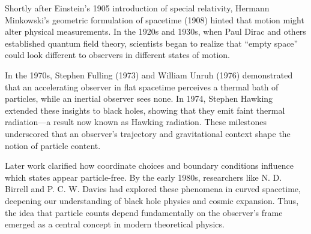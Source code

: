 \begin{historical}
Shortly after Einstein’s 1905 introduction of special relativity, Hermann Minkowski’s geometric formulation of spacetime (1908) hinted that motion might alter physical measurements. In the 1920s and 1930s, when Paul Dirac and others established quantum field theory, scientists began to realize that “empty space” could look different to observers in different states of motion.

In the 1970s, Stephen Fulling (1973) and William Unruh (1976) demonstrated that an accelerating observer in flat spacetime perceives a thermal bath of particles, while an inertial observer sees none. In 1974, Stephen Hawking extended these insights to black holes, showing that they emit faint thermal radiation—a result now known as Hawking radiation. These milestones underscored that an observer’s trajectory and gravitational context shape the notion of particle content.

Later work clarified how coordinate choices and boundary conditions influence which states appear particle-free. By the early 1980s, researchers like N. D. Birrell and P. C. W. Davies had explored these phenomena in curved spacetime, deepening our understanding of black hole physics and cosmic expansion. Thus, the idea that particle counts depend fundamentally on the observer’s frame emerged as a central concept in modern theoretical physics.
\end{historical}